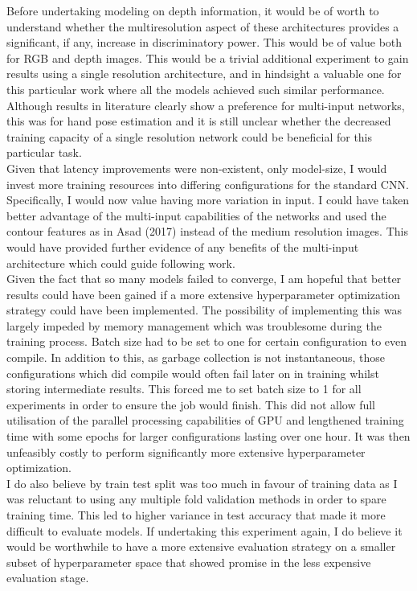 \documentclass{article}
\begin{document}
{Before undertaking modeling on depth information, it would be of worth to understand whether the multiresolution aspect of these architectures provides a significant, if any, increase in discriminatory power. This would be of value both for RGB and depth images. This would be a trivial additional experiment to gain results using a single resolution architecture, and in hindsight a valuable one for this particular work where all the models achieved such similar performance. Although results in literature clearly show a preference for multi-input networks, this was for hand pose estimation and it is still unclear whether the decreased training capacity of a single resolution network could be beneficial for this particular task. \\

Given that latency improvements were non-existent, only model-size, I would invest more training resources into differing configurations for the standard CNN. Specifically, I would now value having more variation in input. I could have taken better advantage of the multi-input capabilities of the networks and used the contour features as in Asad (2017) instead of the medium resolution images. This would have provided further evidence of any benefits of the multi-input architecture which could guide following work. \\

Given the fact that so many models failed to converge, I am hopeful that better results could have been gained if a more extensive hyperparameter optimization strategy could have been implemented. The possibility of implementing this was largely impeded  by memory management which was troublesome during the training process. Batch size had to be set to one for certain configuration to even compile. In addition to this, as garbage collection is not instantaneous, those configurations which did compile would often fail later on in training whilst storing intermediate results. This forced me to set batch size to 1 for all experiments in order to ensure the job would finish. This did not allow full utilisation of the parallel processing capabilities of GPU and lengthened training time with some epochs for larger configurations lasting over one hour. It was then unfeasibly costly to perform significantly more extensive hyperparameter optimization. \\

I do also believe by train test split was too much in favour of training data as I was reluctant to using any multiple fold validation methods in order to spare training time. This led to higher variance in test accuracy that made it more difficult to evaluate models. If undertaking this experiment again, I do believe it would be worthwhile to have a more extensive evaluation strategy on a smaller subset of hyperparameter space that showed promise in the less expensive evaluation stage. \\

}
\end{document}
